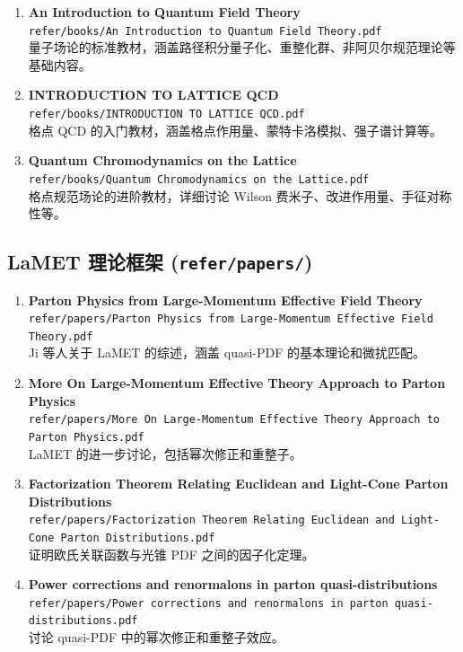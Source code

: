 \documentclass[12pt,a4paper]{ctexart}
\begin{document}
\begin{enumerate}
    \item \textbf{An Introduction to Quantum Field Theory} \\
    \texttt{refer/books/An Introduction to Quantum Field Theory.pdf} \\
    量子场论的标准教材，涵盖路径积分量子化、重整化群、非阿贝尔规范理论等基础内容。

    \item \textbf{INTRODUCTION TO LATTICE QCD} \\
    \texttt{refer/books/INTRODUCTION TO LATTICE QCD.pdf} \\
    格点 QCD 的入门教材，涵盖格点作用量、蒙特卡洛模拟、强子谱计算等。

    \item \textbf{Quantum Chromodynamics on the Lattice} \\
    \texttt{refer/books/Quantum Chromodynamics on the Lattice.pdf} \\
    格点规范场论的进阶教材，详细讨论 Wilson 费米子、改进作用量、手征对称性等。
\end{enumerate}

\subsection{LaMET 理论框架 (\texttt{refer/papers/})}

\begin{enumerate}
    \item \textbf{Parton Physics from Large-Momentum Effective Field Theory} \\
    \texttt{refer/papers/Parton Physics from Large-Momentum Effective Field Theory.pdf} \\
    Ji 等人关于 LaMET 的综述，涵盖 quasi-PDF 的基本理论和微扰匹配。

    \item \textbf{More On Large-Momentum Effective Theory Approach to Parton Physics} \\
    \texttt{refer/papers/More On Large-Momentum Effective Theory Approach to Parton Physics.pdf} \\
    LaMET 的进一步讨论，包括幂次修正和重整子。

    \item \textbf{Factorization Theorem Relating Euclidean and Light-Cone Parton Distributions} \\
    \texttt{refer/papers/Factorization Theorem Relating Euclidean and Light-Cone Parton Distributions.pdf} \\
    证明欧氏关联函数与光锥 PDF 之间的因子化定理。

    \item \textbf{Power corrections and renormalons in parton quasi-distributions} \\
    \texttt{refer/papers/Power corrections and renormalons in parton quasi-distributions.pdf} \\
    讨论 quasi-PDF 中的幂次修正和重整子效应。
\end{enumerate}
\end{document}
